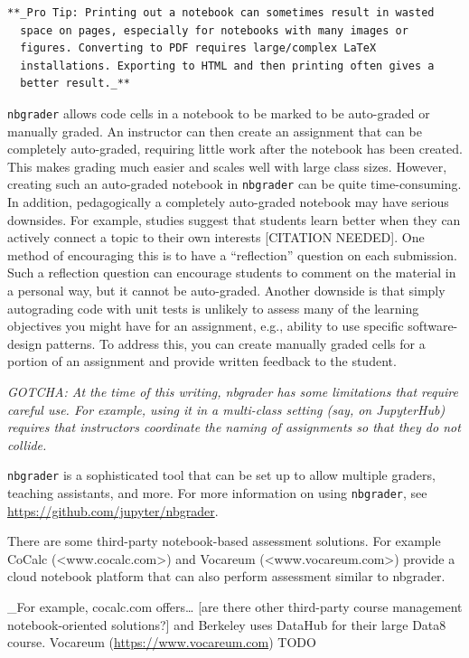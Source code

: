 \documentclass[]{book}
\begin{document}
\begin{verbatim}
**_Pro Tip: Printing out a notebook can sometimes result in wasted
  space on pages, especially for notebooks with many images or
  figures. Converting to PDF requires large/complex LaTeX
  installations. Exporting to HTML and then printing often gives a
  better result._**
\end{verbatim}

\texttt{nbgrader} allows code cells in a notebook to be marked to be
auto-graded or manually graded. An instructor can then create an
assignment that can be completely auto-graded, requiring little work
after the notebook has been created. This makes grading much easier and
scales well with large class sizes. However, creating such an
auto-graded notebook in \texttt{nbgrader} can be quite time-consuming.
In addition, pedagogically a completely auto-graded notebook may have
serious downsides. For example, studies suggest that students learn
better when they can actively connect a topic to their own interests
{[}CITATION NEEDED{]}. One method of encouraging this is to have a
``reflection'' question on each submission. Such a reflection question
can encourage students to comment on the material in a personal way, but
it cannot be auto-graded. Another downside is that simply autograding
code with unit tests is unlikely to assess many of the learning
objectives you might have for an assignment, e.g., ability to use
specific software-design patterns. To address this, you can create
manually graded cells for a portion of an assignment and provide written
feedback to the student.

\emph{GOTCHA: At the time of this writing, nbgrader has some limitations
that require careful use. For example, using it in a multi-class setting
(say, on JupyterHub) requires that instructors coordinate the naming of
assignments so that they do not collide.}

\texttt{nbgrader} is a sophisticated tool that can be set up to allow
multiple graders, teaching assistants, and more. For more information on
using \texttt{nbgrader}, see \url{https://github.com/jupyter/nbgrader}.

There are some third-party notebook-based assessment solutions. For
example CoCalc (\textless{}www.cocalc.com\textgreater{}) and Vocareum
(\textless{}www.vocareum.com\textgreater{}) provide a cloud notebook
platform that can also perform assessment similar to nbgrader.

\_For example, cocalc.com offers\ldots{} {[}are there other third-party
course management notebook-oriented solutions?{]} and Berkeley uses
DataHub for their large Data8 course. Vocareum
(\url{https://www.vocareum.com}) TODO
\end{document}
